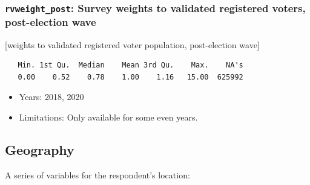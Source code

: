 \documentclass[10pt,article,oneside]{memoir}
\begin{document}
\subsubsection{\texorpdfstring{\texttt{rvweight\_post}: Survey weights
to validated registered voters, post-election
wave}{rvweight\_post: Survey weights to validated registered voters, post-election wave}}\label{rvweight_post-survey-weights-to-validated-registered-voters-post-election-wave}

{[}weights to validated registered voter population, post-election
wave{]}

\begin{verbatim}
   Min. 1st Qu.  Median    Mean 3rd Qu.    Max.    NA's 
   0.00    0.52    0.78    1.00    1.16   15.00  625992 
\end{verbatim}

\begin{itemize}
\tightlist
\item
  Years: 2018, 2020
\item
  Limitations: Only available for some even years.
\end{itemize}

\subsection{Geography}\label{geography}

A series of variables for the respondent's location:
\end{document}
